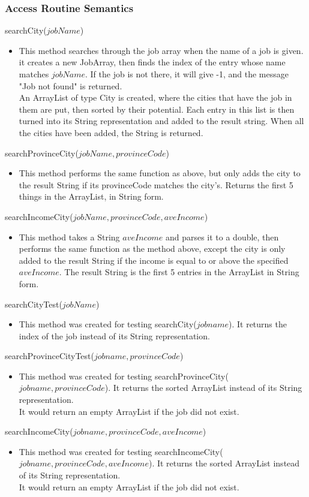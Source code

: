 \documentclass[12pt,fleqn]{article}
\begin{document}
\subsubsection*{Access Routine Semantics}
\noindent searchCity($jobName$)
\begin{itemize}
\item This method searches through the job array when the name of a job is given.
\\it creates a new JobArray, then finds the index of the entry whose name matches $jobName$. If the job is not there, it will give -1, and the message "Job not found" is returned. 
\\An ArrayList of type City is created, where the cities that have the job in them are put, then sorted by their potential. Each entry in this list is then turned into its String representation and added to the result string. When all the cities have been added, the String is returned.
\end{itemize}
\noindent searchProvinceCity($jobName, provinceCode$)
\begin{itemize}
\item This method performs the same function as above, but only adds the city to the result String if its provinceCode matches the city's. Returns the first 5 things in the ArrayList, in String form.
\end{itemize}
\noindent searchIncomeCity($jobName, provinceCode, aveIncome$)
\begin{itemize}
\item This method takes a String $aveIncome$ and parses it to a double, then performs the same function as the method above, except the city is only added to the result String if the income is equal to or above the specified $aveIncome$. The result String is the first 5 entries in the ArrayList in String form.
\end{itemize}
\noindent searchCityTest($jobName$)
\begin{itemize}
\item This method was created for testing searchCity($jobname$). It returns the index of the job instead of its String representation.
\end{itemize}
\noindent searchProvinceCityTest($jobname, provinceCode$)
\begin{itemize}
\item This method was created for testing searchProvinceCity($jobname, provinceCode$). It returns the sorted ArrayList instead of its String representation.
\\It would return an empty ArrayList if the job did not exist.
\end{itemize}
\noindent searchIncomeCity($jobname, provinceCode, aveIncome$)
\begin{itemize}
\item This method was created for testing searchIncomeCity($jobname, provinceCode, aveIncome$). It returns the sorted ArrayList instead of its String representation.
\\It would return an empty ArrayList if the job did not exist.
\end{itemize}
\end{document}

